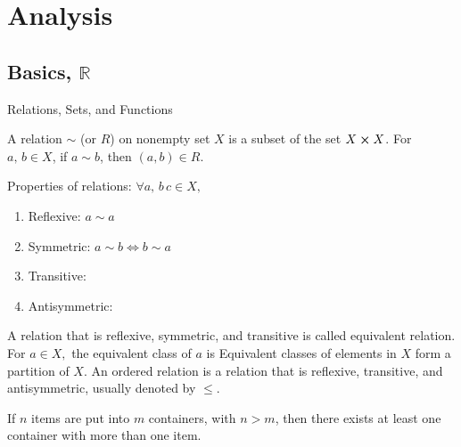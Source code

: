 \chapter{Analysis}

\section{Basics, $\mathbb{R}$}
Relations, Sets, and Functions

\begin{definition}[Relation]
    A relation $\sim$ (or $R$) on nonempty set $X$ is a subset of the set $X\cross X$. For $a,\,b\in X$, if $a\sim b$, then $(a,b)\in R$.
\end{definition}

Properties of relations: $\forall a,\,b\,c\in X,$
\begin{enumerate}
    \item Reflexive: $a\sim a$
    \item Symmetric: $a\sim b \iff b\sim a$
    \item Transitive:
    \item Antisymmetric:
\end{enumerate}

A relation that is reflexive, symmetric, and transitive is called equivalent relation. For $a\in X,$ the equivalent class of $a$ is
Equivalent classes of elements in $X$ form a partition of $X.$ An ordered relation is a relation that is reflexive, transitive, and antisymmetric, usually denoted by $\leq.$


\begin{theorem}
    If $n$ items are put into $m$ containers, with $n>m$, then there exists at least one container with more than one item.
\end{theorem}

